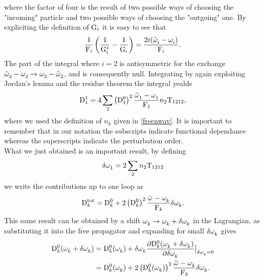 where the factor of four is the result of two possible ways of choosing the "incoming" particle and two possible ways of choosing the "outgoing" one.
By expliciting the definition of $\mathrm{G}_i$ it is easy to see that
\begin{equation}
    \frac{1}{\mathrm{F}_i}\left( \frac{1}{\mathrm{G}_i^*} - \frac{1}{\mathrm{G}_i}\right) = \frac{2 i(\tilde{\omega}^{}_i - \omega^{}_i)}{\mathrm{F}_i}.
\end{equation}
The part of the integral where $i=2$ is antisymmetric for the exchange $\tilde{\omega}^{}_2 - \omega^{}_2 \rightarrow \omega^{}_2 - \tilde{\omega}^{}_2$, and is consequently null. Integrating
by again exploiting Jordan's lemma and the residue theorem the integral yealds
\begin{equation}
    \mathrm{D}_1^1 = 4\sum_2 \left( \mathrm{D}_1^0 \right)^2\frac{\tilde{\omega}^{}_1 - \omega^{}_1}{\mathrm{F}_1}n_2\mathrm{T}_{1212},
\end{equation}
where we used the definition of $n_k$ given in \eqref{freenwav}. It is important to remember that in our notation the subscripts indicate functional dependance whereas 
the superscripts indicate the perturbation order. \\
What we just obtained is an important result, by defining 
\begin{equation}
    \delta \omega^{}_1 = 2\sum_2 n_2 \mathrm{T}_{1212} 
    \label{shiftilritorno}
\end{equation} 
we write the contributions up to one loop as
\begin{equation}
    \mathrm{D}_k^{\text{tot}} = \mathrm{D}_k^0 + 2\left( \mathrm{D}_k^0 \right)^2 \frac{\tilde{\omega}^{} - \omega^{}_k}{\mathrm{F}_k}\delta \omega^{}_k. 
\end{equation}
This same result can be obtained by a shift $\omega^{}_k \rightarrow \omega^{}_k + \delta \omega^{}_k$ in the Lagrangian, 
as substituting it into the free propagator and expanding for small $\delta \omega^{}_k$ gives
\begin{align}
    \mathrm{D}_k^0(\omega^{}_k + \delta\omega^{}_k) &= \mathrm{D}_k^0(\omega^{}_k) + \delta\omega^{}_k\frac{\partial\mathrm{D}_k^0(\omega^{}_k + \delta\omega^{}_k)}{\partial \delta\omega^{}_k}\big\rvert_{\delta\omega^{}_k = 0} \\ 
    &=   \mathrm{D}_k^0(\omega^{}_k) + 2\left( \mathrm{D}_k^0(\omega^{}_k) \right)^2 \frac{\tilde{\omega}^{} - \omega^{}_k}{\mathrm{F}_k}\delta \omega^{}_k.
\end{align} 

